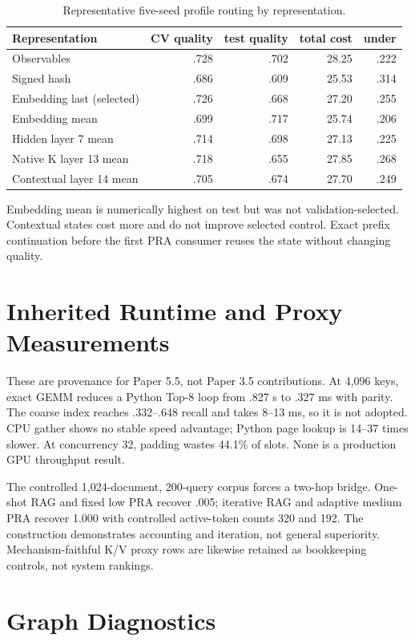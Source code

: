 \documentclass[11pt]{article}
\begin{document}
\begin{table}[H]
\centering
\small
\caption{Representative five-seed profile routing by representation.}
\begin{tabular}{lrrrr}
\toprule
Representation & CV quality & test quality & total cost & under\\
\midrule
Observables & .728 & .702 & 28.25 & .222\\
Signed hash & .686 & .609 & 25.53 & .314\\
Embedding last (selected) & .726 & .668 & 27.20 & .255\\
Embedding mean & .699 & .717 & 25.74 & .206\\
Hidden layer 7 mean & .714 & .698 & 27.13 & .225\\
Native K layer 13 mean & .718 & .655 & 27.85 & .268\\
Contextual layer 14 mean & .705 & .674 & 27.70 & .249\\
\bottomrule
\end{tabular}
\end{table}

Embedding mean is numerically highest on test but was not validation-selected. Contextual states
cost more and do not improve selected control. Exact prefix continuation before the first PRA
consumer reuses the state without changing quality.

\section{Inherited Runtime and Proxy Measurements}

These are provenance for Paper 5.5, not Paper 3.5 contributions. At 4,096 keys, exact GEMM reduces a
Python Top-8 loop from .827 s to .327 ms with parity. The coarse index reaches .332--.648 recall and
takes 8--13 ms, so it is not adopted. CPU gather shows no stable speed advantage; Python page lookup
is 14--37 times slower. At concurrency 32, padding wastes 44.1\% of slots. None is a production GPU
throughput result.

The controlled 1,024-document, 200-query corpus forces a two-hop bridge. One-shot RAG and fixed low
PRA recover .005; iterative RAG and adaptive medium PRA recover 1.000 with controlled active-token
counts 320 and 192. The construction demonstrates accounting and iteration, not general superiority.
Mechanism-faithful K/V proxy rows are likewise retained as bookkeeping controls, not system rankings.

\section{Graph Diagnostics}
\label{app:graph}
\end{document}
